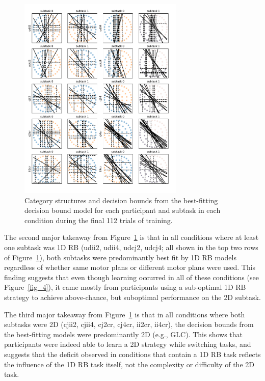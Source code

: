 \documentclass[doc, floatsintext]{apa7}
\begin{document}
\begin{figure}[h!]
    \centering
    \includegraphics[width=0.7\textwidth]{../figures/fig_7.pdf}
    \caption{
        Category structures and decision bounds from the
        best-fitting decision bound model for each participant
        and subtask in each condition during the final 112
        trials of training.
    }
    \label{fig_7}
\end{figure}

The second major takeaway from Figure~\ref{fig_7} is that in
all conditions where at least one subtask was 1D RB (udii2,
udii4, udcj2, udcj4; all shown in the top two rows of
Figure~\ref{fig_7}), both subtasks were predominantly best
fit by 1D RB models regardless of whether same motor plans
or different motor plans were used. This finding suggests
that even though learning occurred in all of these
conditions (see Figure~\ref{fig_4}), it came mostly from
participants using a sub-optimal 1D RB strategy to achieve
above-chance, but suboptimal performance on the 2D subtask.

The third major takeaway from Figure~\ref{fig_7} is that in
all conditions where both subtasks were 2D (cjii2, cjii4,
cj2cr, cj4cr, ii2cr, ii4cr), the decision bounds from the
best-fitting models were predominantly 2D (e.g., GLC). This
shows that participants were indeed able to learn a 2D
strategy while switching tasks, and suggests that the
deficit observed in conditions that contain a 1D RB task
reflects the influence of the 1D RB task itself, not the
complexity or difficulty of the 2D task.
\end{document}
